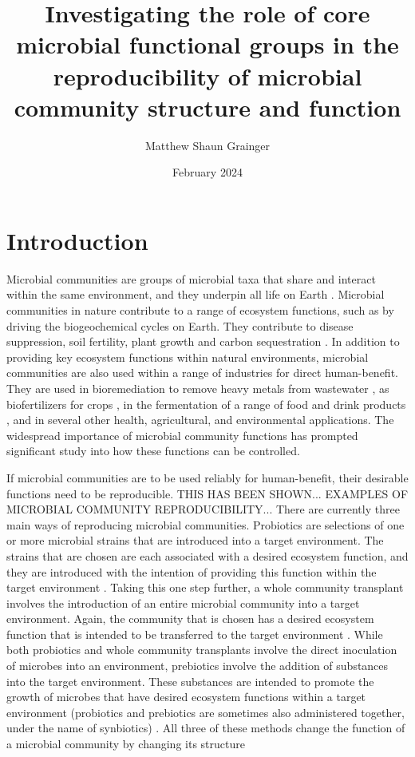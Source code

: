 \documentclass[11pt]{article}
\title{Investigating the role of core microbial functional groups in the reproducibility of microbial community structure and function}
\author{Matthew Shaun Grainger}
\date{February 2024}
\begin{document}
\onehalfspacing
\maketitle

\section{Introduction}

Microbial communities are groups of microbial taxa that share and interact within the same environment, and they underpin all life on Earth \citep{Konopka2009, Widder2016, Nemergut2013-uw}. Microbial communities in nature contribute to a range of ecosystem functions, such as by driving the biogeochemical cycles on Earth. They contribute to disease suppression, soil fertility, plant growth and carbon sequestration \citep{Sokol2022}. In addition to providing key ecosystem functions within natural environments, microbial communities are also used within a range of industries for direct human-benefit. They are used in bioremediation to remove heavy metals from wastewater \citep{SHARMA2021101826}, as biofertilizers for crops \citep{biofertilizer}, in the fermentation of a range of food and drink products \citep{WOLFE201549}, and in several other health, agricultural, and environmental applications. The widespread importance of microbial community functions has prompted significant study into how these functions can be controlled.

If microbial communities are to be used reliably for human-benefit, their desirable functions need to be reproducible. THIS HAS BEEN SHOWN... EXAMPLES OF MICROBIAL COMMUNITY REPRODUCIBILITY...
There are currently three main ways of reproducing microbial communities. Probiotics are selections of one or more microbial strains that are introduced into a target environment. The strains that are chosen are each associated with a desired ecosystem function, and they are introduced with the intention of providing this function within the target environment \citep{Pandey2015-rf, Sanders2019}. Taking this one step further, a whole community transplant involves the introduction of an entire microbial community into a target environment. Again, the community that is chosen has a desired ecosystem function that is intended to be transferred to the target environment \citep{Jiang2022, doi:10.1128/mbio.00893-14}. While both probiotics and whole community transplants involve the direct inoculation of microbes into an environment, prebiotics involve the addition of substances into the target environment. These substances are intended to promote the growth of microbes that have desired ecosystem functions within a target environment (probiotics and prebiotics are sometimes also administered together, under the name of synbiotics) \citep{Pandey2015-rf, Sanders2019}. All three of these methods change the function of a microbial community by changing its structure
\end{document}
